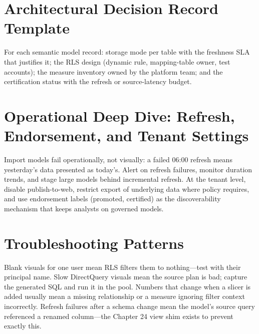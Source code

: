 \section{Architectural Decision Record Template}
For each semantic model record: storage mode per table with the freshness SLA that justifies it; the RLS design (dynamic rule, mapping-table owner, test accounts); the measure inventory owned by the platform team; and the certification status with the refresh or source-latency budget.

\section{Operational Deep Dive: Refresh, Endorsement, and Tenant Settings}
Import models fail operationally, not visually: a failed 06:00 refresh means yesterday's data presented as today's. Alert on refresh failures, monitor duration trends, and stage large models behind incremental refresh. At the tenant level, disable publish-to-web, restrict export of underlying data where policy requires, and use endorsement labels (promoted, certified) as the discoverability mechanism that keeps analysts on governed models.

\section{Troubleshooting Patterns}
Blank visuals for one user mean RLS filters them to nothing---test with their principal name. Slow DirectQuery visuals mean the source plan is bad; capture the generated SQL and run it in the pool. Numbers that change when a slicer is added usually mean a missing relationship or a measure ignoring filter context incorrectly. Refresh failures after a schema change mean the model's source query referenced a renamed column---the Chapter 24 view shim exists to prevent exactly this.

